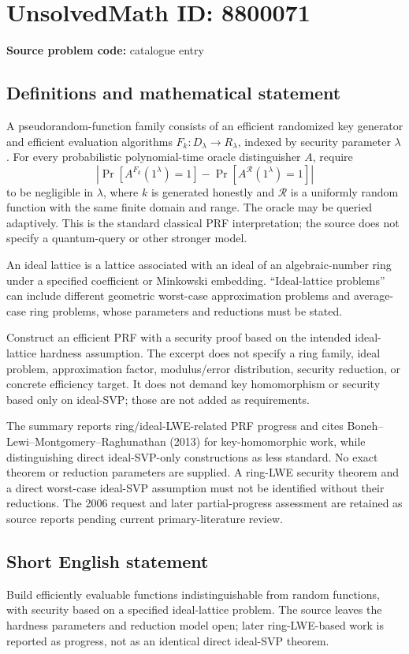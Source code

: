 \documentclass[11pt]{article}
\begin{document}
\section*{UnsolvedMath ID: 8800071}
\textbf{Source problem code:} catalogue entry
\subsection{Definitions and mathematical statement}
A pseudorandom-function family consists of an efficient randomized key generator and efficient evaluation algorithms \(F_k:D_\lambda\to R_\lambda\), indexed by security parameter \(\lambda\). For every probabilistic polynomial-time oracle distinguisher \(A\), require
\[
 \left|\Pr[A^{F_k}(1^\lambda)=1]-\Pr[A^{\mathcal R}(1^\lambda)=1]\right|
\]
to be negligible in \(\lambda\), where \(k\) is generated honestly and \(\mathcal R\) is a uniformly random function with the same finite domain and range. The oracle may be queried adaptively. This is the standard classical PRF interpretation; the source does not specify a quantum-query or other stronger model.

An ideal lattice is a lattice associated with an ideal of an algebraic-number ring under a specified coefficient or Minkowski embedding. ``Ideal-lattice problems'' can include different geometric worst-case approximation problems and average-case ring problems, whose parameters and reductions must be stated.

Construct an efficient PRF with a security proof based on the intended ideal-lattice hardness assumption. The excerpt does not specify a ring family, ideal problem, approximation factor, modulus/error distribution, security reduction, or concrete efficiency target. It does not demand key homomorphism or security based only on ideal-SVP; those are not added as requirements.

The summary reports ring/ideal-LWE-related PRF progress and cites Boneh--Lewi--Montgomery--Raghunathan (2013) for key-homomorphic work, while distinguishing direct ideal-SVP-only constructions as less standard. No exact theorem or reduction parameters are supplied. A ring-LWE security theorem and a direct worst-case ideal-SVP assumption must not be identified without their reductions. The 2006 request and later partial-progress assessment are retained as source reports pending current primary-literature review.
\subsection{Short English statement}
Build efficiently evaluable functions indistinguishable from random functions, with security based on a specified ideal-lattice problem. The source leaves the hardness parameters and reduction model open; later ring-LWE-based work is reported as progress, not as an identical direct ideal-SVP theorem.
\end{document}

